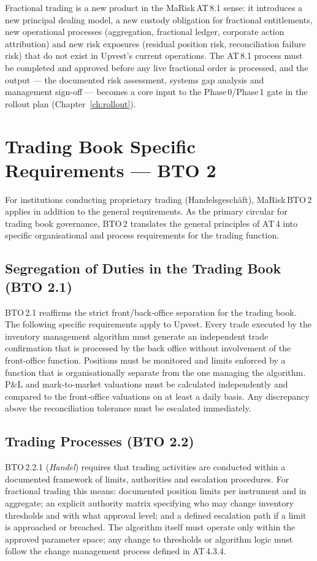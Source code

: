 \documentclass[12pt,a4paper]{report}
\begin{document}
Fractional trading is a new product in the MaRisk\,AT\,8.1 sense: it introduces
a new principal dealing model, a new custody obligation for fractional
entitlements, new operational processes (aggregation, fractional ledger,
corporate action attribution) and new risk exposures (residual position risk,
reconciliation failure risk) that do not exist in Upvest's current operations.
The AT\,8.1 process must be completed and approved before any live fractional
order is processed, and the output --- the documented risk assessment, systems
gap analysis and management sign-off --- becomes a core input to the
Phase\,0/Phase\,1 gate in the rollout plan (Chapter~\ref{ch:rollout}).

\section{Trading Book Specific Requirements --- BTO 2}
\label{sec:bto2}

For institutions conducting proprietary trading (Handelsgesch{\"a}ft),
MaRisk\,BTO\,2 applies in addition to the general requirements. As the primary
circular for trading book governance, BTO\,2 translates the general principles
of AT\,4 into specific organisational and process requirements for the trading
function.

\subsection{Segregation of Duties in the Trading Book (BTO 2.1)}

BTO\,2.1 reaffirms the strict front/back-office separation for the trading
book. The following specific requirements apply to Upvest. Every trade executed
by the inventory management algorithm must generate an independent trade
confirmation that is processed by the back office without involvement of the
front-office function. Positions must be monitored and limits enforced by a
function that is organisationally separate from the one managing the algorithm.
P\&L and mark-to-market valuations must be calculated independently and compared
to the front-office valuations on at least a daily basis. Any discrepancy above
the reconciliation tolerance must be escalated immediately.

\subsection{Trading Processes (BTO 2.2)}

BTO\,2.2.1 (\textit{Handel}) requires that trading activities are conducted
within a documented framework of limits, authorities and escalation procedures.
For fractional trading this means: documented position limits per instrument
and in aggregate; an explicit authority matrix specifying who may change
inventory thresholds and with what approval level; and a defined escalation
path if a limit is approached or breached. The algorithm itself must operate
only within the approved parameter space; any change to thresholds or algorithm
logic must follow the change management process defined in AT\,4.3.4.
\end{document}
